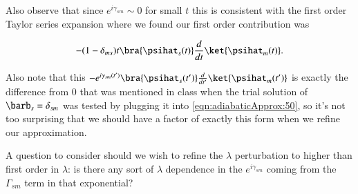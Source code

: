 Also observe that since $e^{i\gamma_{sm}} \sim 0$ for small $t$ this is consistent with the first order Taylor series expansion where we found our first order contribution was

\begin{equation}\label{eqn:adiabaticApprox:470}
- (1 - \delta_{ms}) t \bra{\psihat_s(t)} \frac{d}{dt} \ket{\psihat_m(t)}.
\end{equation}

Also note that this $-e^{i \gamma_{sm}(t') } \bra{\psihat_s(t')} \frac{d}{dt'} \ket{\psihat_m(t')}$ is exactly the difference from $0$ that was mentioned in class when the trial solution of $\barb_s = \delta_{sm}$ was tested by plugging it into \ref{eqn:adiabaticApprox:50}, so it's not too surprising that we should have a factor of exactly this form when we refine our approximation.

A question to consider should we wish to refine the $\lambda$ perturbation to higher than first order in $\lambda$: is there any sort of $\lambda$ dependence in the $e^{i \gamma_{sm}}$ coming from the $\Gamma_{sm}$ term in that exponential?

\EndArticle
